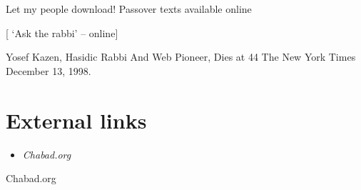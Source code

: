 Let my people download! Passover texts available online

{[} `Ask the rabbi' -- online{]}

Yosef Kazen, Hasidic Rabbi And Web Pioneer, Dies at 44 The New York
Times December 13, 1998.

\section{External links}\label{external-links}

\begin{itemize}
\item
  \emph{Chabad.org}
\end{itemize}

Chabad.org
